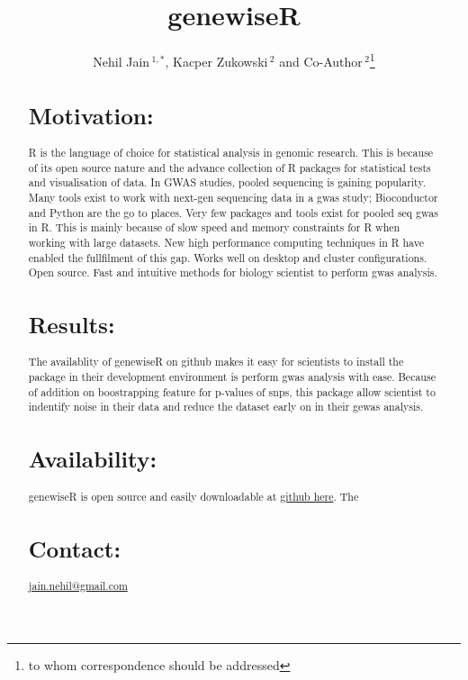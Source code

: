 \documentclass{bioinfo}
\begin{document}

\title[genewiseR]{genewiseR}
\author[Sample \textit{et~al}]{Nehil Jain\,$^{1,*}$, Kacper Zukowski\,$^{2}$ and Co-Author\,$^2$\footnote{to whom correspondence should be addressed}}
\address{$^{1}$Department of Computer Science, Address XXXX etc.\\
$^{2}$Department of XXXXXXXX, Address XXXX etc.}



\maketitle

\begin{abstract}

\section{Motivation:}

R is the language of choice for statistical analysis in genomic research. This is because of its open source nature and the advance collection of R packages for statistical tests and visualisation of data. In GWAS studies, pooled sequencing is gaining popularity. Many tools exist to work with next-gen sequencing data in a gwas study; Bioconductor and Python are the go to places. Very few packages and tools exist for pooled seq gwas in R. This is mainly because of slow speed and memory constraints for R when working with large datasets. New high performance computing techniques in R have enabled the fullfilment of this gap.  Works well on desktop and cluster configurations. Open source. Fast and intuitive methods for biology scientist to perform gwas analysis. 

\section{Results:}
The availablity of genewiseR on github makes it easy for scientists to install the package in their development environment is perform gwas analysis with ease. Because of addition on boostrapping feature for p-values of snps, this package allow scientist to indentify noise in their data and reduce the dataset early on in their gewas analysis. 

\section{Availability:}
genewiseR is open source and easily downloadable at \href{http://github.com/nehiljain/genewiseR}{github here}. The  

\section{Contact:} \href{jain.nehil@gmail.com}{jain.nehil@gmail.com}
\end{abstract}
\end{document}
